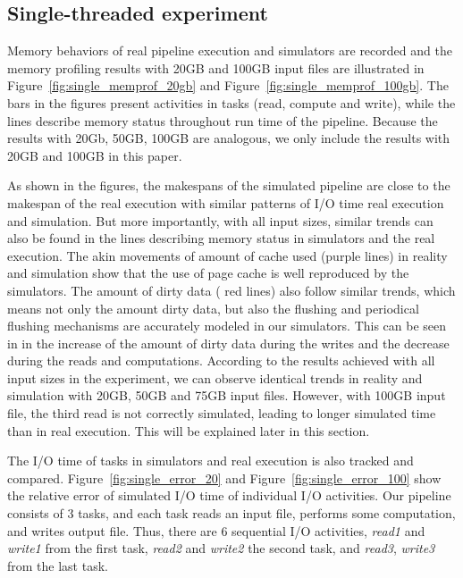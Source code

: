 \documentclass[conference]{IEEEtran}
\begin{document}
		\subsection{Single-threaded experiment}

			Memory behaviors of real pipeline execution and simulators are recorded 
			and the memory profiling results with 20GB and 100GB input files 
			are illustrated in Figure~\ref{fig:single_memprof_20gb} and Figure~\ref{fig:single_memprof_100gb}. 
			The bars in the figures present activities in tasks (read, compute and write), 
			while the lines describe memory status throughout run time of the pipeline. 
			Because the results with 20Gb, 50GB, 100GB are analogous, we only include 
			the results with 20GB and 100GB in this paper. 
			
			As shown in the figures, the makespans of the simulated pipeline are 
			close to the makespan of the real execution with similar patterns of I/O time 
			real execution and simulation. 
			But more importantly, with all input sizes, similar trends can also be found 
			in the lines describing memory status in simulators and the real execution. 
			The akin movements of amount of cache used (purple lines) in reality 
			and simulation show that the use of page cache is well reproduced by the simulators. 
			The amount of dirty data ( red lines) also follow similar trends, 
			which means not only the amount dirty data, but also the flushing and 
			periodical flushing mechanisms are accurately modeled in our simulators. 
			This can be seen in in the increase of the amount of dirty data during the writes 
			and the decrease during the reads and computations. 
			According to the results achieved with all input sizes in the experiment, 
			we can observe identical trends in reality and simulation with 20GB, 
			50GB and 75GB input files. However, with 100GB input file, 
			the third read is not correctly simulated, leading to longer simulated time 
			than in real execution. This will be explained later in this section.
			
			The I/O time of tasks in simulators and real execution is also tracked and compared. 
			Figure~\ref{fig:single_error_20} and Figure~\ref{fig:single_error_100} show 
			the relative error of simulated I/O time of individual I/O activities. 
			Our pipeline consists of 3 tasks, and each task reads an input file, 
			performs some computation, and writes output file. 
			Thus, there are 6 sequential I/O activities, \textit{read1} and \textit{write1} 
			from the first task, \textit{read2} and \textit{write2} the second task, 
			and \textit{read3}, \textit{write3} from the last task.
			
\end{document}
